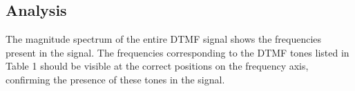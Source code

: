 \subsection*{Analysis}
The magnitude spectrum of the entire DTMF signal shows the frequencies present in the signal. The frequencies corresponding to the DTMF tones listed in Table 1 should be visible at the correct positions on the frequency axis, confirming the presence of these tones in the signal.
